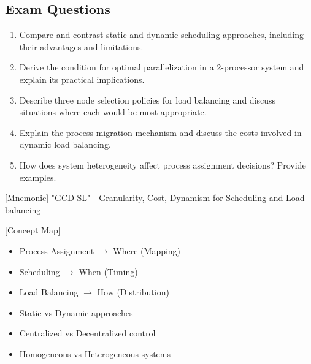 \documentclass[12pt]{article}
\begin{document}
\subsection*{Exam Questions}
\begin{enumerate}
\item Compare and contrast static and dynamic scheduling approaches, including their advantages and limitations.

\item Derive the condition for optimal parallelization in a 2-processor system and explain its practical implications.

\item Describe three node selection policies for load balancing and discuss situations where each would be most appropriate.

\item Explain the process migration mechanism and discuss the costs involved in dynamic load balancing.

\item How does system heterogeneity affect process assignment decisions? Provide examples.
\end{enumerate}

[Mnemonic] "GCD SL" - Granularity, Cost, Dynamism for Scheduling and Load balancing

[Concept Map]
\begin{itemize}
\item Process Assignment $\rightarrow$ Where (Mapping)
\item Scheduling $\rightarrow$ When (Timing)
\item Load Balancing $\rightarrow$ How (Distribution)
\item Static vs Dynamic approaches
\item Centralized vs Decentralized control
\item Homogeneous vs Heterogeneous systems
\end{itemize}
\end{document}
